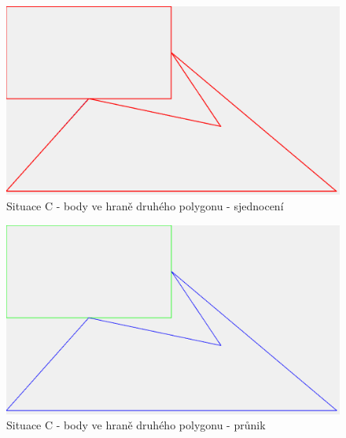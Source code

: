 \documentclass[a4paper,11pt,twoside]{article}
\begin{document}
\vspace{0.2cm}
\begin{figure}[hbt!] 
\begin{center}
\includegraphics[width=14cm]{pictures/C_union.png} 
\caption[Situace C - body ve hraně druhého polygonu - sjednocení]{Situace C - body ve hraně druhého polygonu - sjednocení}
\label{fig:C_union}
\end{center}
\end{figure}

\vspace{0.2cm}
\begin{figure}[hbt!] 
\begin{center}
\includegraphics[width=14cm]{pictures/C_intersect.png} 
\caption[Situace C - body ve hraně druhého polygonu - průnik]{Situace C - body ve hraně druhého polygonu - průnik}
\label{fig:C_intersect}
\end{center}
\end{figure}
\end{document}
